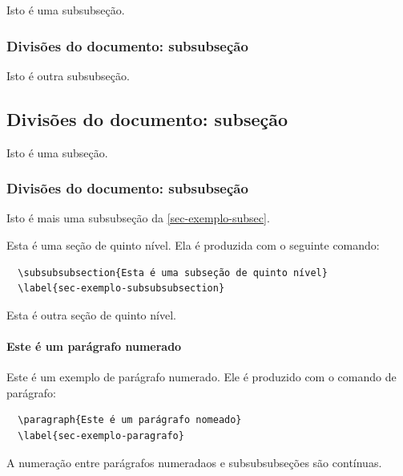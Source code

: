 \documentclass[article,12pt,oneside,a4paper,chapter=TITLE,english,brazil]{abntex2}
\begin{document}
\begin{anexosenv}
Isto é uma subsubseção.

\subsubsection{Divisões do documento: subsubseção}

Isto é outra subsubseção.

\subsection{Divisões do documento: subseção}\label{sec-exemplo-subsec}

Isto é uma subseção.

\subsubsection{Divisões do documento: subsubseção}

Isto é mais uma subsubseção da \autoref{sec-exemplo-subsec}.


\label{sec-exemplo-subsubsubsection}

Esta é uma seção de quinto nível. Ela é produzida com o seguinte comando:
\begin{verbatim}
  \subsubsubsection{Esta é uma subseção de quinto nível}
  \label{sec-exemplo-subsubsubsection}
\end{verbatim}

\label{sec-exemplo-subsubsubsection-outro}

Esta é outra seção de quinto nível.

\paragraph{Este é um parágrafo numerado}\label{sec-exemplo-paragrafo}

Este é um exemplo de parágrafo numerado. Ele é produzido com o comando de parágrafo:
\begin{verbatim}
  \paragraph{Este é um parágrafo nomeado}
  \label{sec-exemplo-paragrafo}
\end{verbatim}

A numeração entre parágrafos numeradaos e subsubsubseções são contínuas.


\end{anexosenv}
\end{document}
